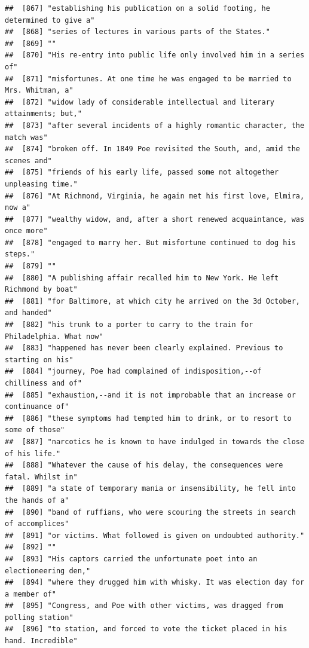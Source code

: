 \documentclass{article}\usepackage[]{graphicx}\usepackage[]{color}
\makeatletter
\newenvironment{kframe}{%
 \def\at@end@of@kframe{}%
 \ifinner\ifhmode%
  \def\at@end@of@kframe{\end{minipage}}%
  \begin{minipage}{\columnwidth}%
 \fi\fi%
 \def\FrameCommand##1{\hskip\@totalleftmargin \hskip-\fboxsep
 \colorbox{shadecolor}{##1}\hskip-\fboxsep
     \hskip-\linewidth \hskip-\@totalleftmargin \hskip\columnwidth}%
 \MakeFramed {\advance\hsize-\width
   \@totalleftmargin\z@ \linewidth\hsize
   \@setminipage}}%
 {\par\unskip\endMakeFramed%
 \at@end@of@kframe}
\newenvironment{knitrout}{}{} %
\makeatother
\begin{document}
\begin{knitrout}
\begin{kframe}
\begin{verbatim}
##  [867] "establishing his publication on a solid footing, he determined to give a"    
##  [868] "series of lectures in various parts of the States."                          
##  [869] ""                                                                            
##  [870] "His re-entry into public life only involved him in a series of"              
##  [871] "misfortunes. At one time he was engaged to be married to Mrs. Whitman, a"    
##  [872] "widow lady of considerable intellectual and literary attainments; but,"      
##  [873] "after several incidents of a highly romantic character, the match was"       
##  [874] "broken off. In 1849 Poe revisited the South, and, amid the scenes and"       
##  [875] "friends of his early life, passed some not altogether unpleasing time."      
##  [876] "At Richmond, Virginia, he again met his first love, Elmira, now a"           
##  [877] "wealthy widow, and, after a short renewed acquaintance, was once more"       
##  [878] "engaged to marry her. But misfortune continued to dog his steps."            
##  [879] ""                                                                            
##  [880] "A publishing affair recalled him to New York. He left Richmond by boat"      
##  [881] "for Baltimore, at which city he arrived on the 3d October, and handed"       
##  [882] "his trunk to a porter to carry to the train for Philadelphia. What now"      
##  [883] "happened has never been clearly explained. Previous to starting on his"      
##  [884] "journey, Poe had complained of indisposition,--of chilliness and of"         
##  [885] "exhaustion,--and it is not improbable that an increase or continuance of"    
##  [886] "these symptoms had tempted him to drink, or to resort to some of those"      
##  [887] "narcotics he is known to have indulged in towards the close of his life."    
##  [888] "Whatever the cause of his delay, the consequences were fatal. Whilst in"     
##  [889] "a state of temporary mania or insensibility, he fell into the hands of a"    
##  [890] "band of ruffians, who were scouring the streets in search of accomplices"    
##  [891] "or victims. What followed is given on undoubted authority."                  
##  [892] ""                                                                            
##  [893] "His captors carried the unfortunate poet into an electioneering den,"        
##  [894] "where they drugged him with whisky. It was election day for a member of"     
##  [895] "Congress, and Poe with other victims, was dragged from polling station"      
##  [896] "to station, and forced to vote the ticket placed in his hand. Incredible"    

\end{verbatim}
\end{kframe}
\end{knitrout}
\end{document}
